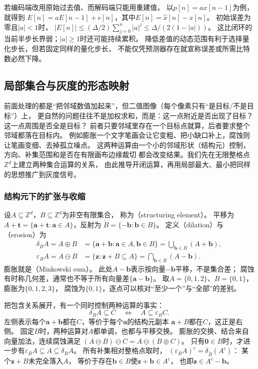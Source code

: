 若编码端改用原始过去值、而解码端只能用重建值，
以$p[n]=a x[n-1]$为例，就得到
$E[n]=aE[n-1]+e[n]$，其中$E[n]=\widehat x[n]-x[n]$。
初始误差为零且$|a|<1$时，
$|E[n]|\leq(\Delta/2)\sum_{j=0}^n|a|^j
\leq\Delta/(2(1-|a|))$。
这比闭环的当前半步长界弱；$|a|\geq1$时还可能持续累积。
降低差值的动态范围有利于选择量化步长，但若固定同样的量化步长，
不能仅凭预测器存在就宣称误差或所需比特数必然下降。

\subsection{局部集合与灰度的形态映射}
\label{sec:signal-morphological-maps}

前面处理的都是“把邻域数值加起来”，但二值图像（每个像素只有“是目标/不是目标”）上，
更自然的问题往往不是加权求和，而是：这一点附近是否出现了目标？这一点周围是否全是目标？
前者只要邻域里存在一个目标点就算，后者要求整个邻域都落在目标内。
例如膨胀一个文字笔画会让它变粗、把小缺口补上，腐蚀则让笔画变细、去掉孤立噪点。
这两种运算由一个小的邻域形状（结构元）控制，方向、补集范围和是否在有限画布边缘裁切
都会改变结果。我们先在无限整格点$\mathbb Z^d$上建立两种集合运算的关系，
由此推导开闭运算，再用局部最大、最小把同样的思想推广到灰度信号。

\subsubsection{结构元下的扩张与收缩}
设$A\subseteq\mathbb Z^d$，$B\subseteq\mathbb Z^d$为非空有限集合，
称为（structuring element）。
平移为$A+\bm t=\{\bm a+\bm t:\bm a\in A\}$，反射为
$\check B=\{-\bm b:\bm b\in B\}$。
定义（dilation）与（erosion）为
\begin{equation}
 \begin{aligned}
 \delta_B A=A\oplus B
 &=\{\bm a+\bm b:\bm a\in A,\bm b\in B\}
   =\bigcup_{\bm b\in B}(A+\bm b),\\
 \varepsilon_B A=A\ominus B
 &=\{\bm z:\bm z+B\subseteq A\}
   =\bigcap_{\bm b\in B}(A-\bm b).
 \end{aligned}
 \label{eq:signal-minkowski-morphology}
\end{equation}
膨胀就是（Minkowski sum）。
此处$A-\bm b$表示按向量$-\bm b$平移，不是集合差；
腐蚀有时称几何差，通常也不等于所有向量差$\{\bm a-\bm b\}$。
取$A=\{0,1,2\}$、$B=\{0,1\}$，膨胀为$\{0,1,2,3\}$，
腐蚀为$\{0,1\}$，逐点可以核对“至少一个”与“全部”的差别。

把包含关系展开，有一个同时控制两种运算的事实：
\begin{equation}
 \delta_B A\subseteq C
 \quad\Longleftrightarrow\quad A\subseteq\varepsilon_B C.
 \label{eq:signal-morphology-adjunction}
\end{equation}
左侧表示每个$\bm a+\bm b$都在$C$，等价于每个$\bm a$的结构元副本
$\bm a+B$都在$C$，这正是右侧。
固定$B$时，两种运算对$A$都单调，也都与平移交换。
膨胀的交换、结合来自向量加法，连续腐蚀满足
$(A\ominus B)\ominus C=A\ominus(B\oplus C)$。
只有$\bm0\in B$时，才进一步有$\varepsilon_B A\subseteq A\subseteq\delta_B A$。
所有补集相对整格点取时，
$(\varepsilon_B A)^c=\delta_{\check B}(A^c)$：
某个$\bm z+B$未完全落入$A$，
等价于存在$\bm b\in B$使$\bm z+\bm b\in A^c$，
也即$\bm z\in A^c-\bm b$。

